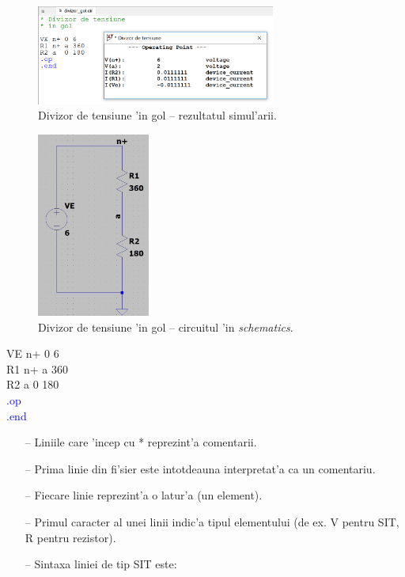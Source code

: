 \begin{enumerate}
\begin{figure}[!b]
	\centering
		\includegraphics[width=0.7\textwidth]{laborator_01/figuri/spice_divizor_gol_op}
	\caption{Divizor de tensiune 'in gol -- rezultatul simul'arii.}
	\label{fig:spice_ex1_3}
\end{figure}
\begin{figure}[!b]
	\centering
		\includegraphics[width=0.33\textwidth]{laborator_01/figuri/spice_divizor_schematics}
	\caption{Divizor de tensiune 'in gol -- circuitul 'in \textit{schematics}.}
	\label{fig:spice_ex1_4}
\end{figure}

VE n+ 0 6 \\
R1 n+ a 360 \\
R2 a  0 180 \\
\textcolor{blue}{.op} \\
\textcolor{blue}{.end} 

\begin{itemize}
\item[--] Liniile care 'incep cu * reprezint'a comentarii.
\item[--] Prima linie din fi'sier este intotdeauna interpretat'a ca un comentariu.
\item[--] Fiecare linie reprezint'a o latur'a (un element).
\item[--] Primul caracter al unei linii indic'a tipul elementului (de ex. V pentru SIT, R pentru rezistor).
\item[--] Sintaxa liniei de tip SIT este:


\end{itemize}
\end{enumerate}
